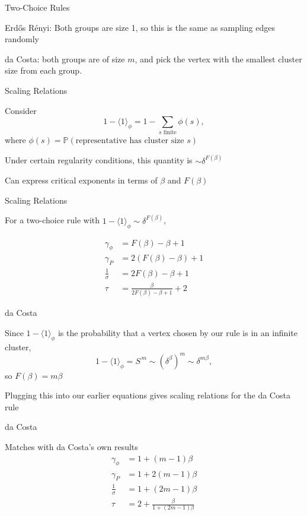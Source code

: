 \documentclass{beamer}
\newcommand{\ang}[1]{\langle #1 \rangle}
\newcommand{\ER}{Erd\H{o}s R\'enyi\xspace}
\newcommand{\nl}{
\vspace{5mm}

}
\begin{document}
\begin{frame}{Two-Choice Rules}
	
	\ER: Both groups are size 1, so this is the same as sampling edges randomly \nl

	\pause
	da Costa: both groups are of size $m$, and pick the vertex with the smallest cluster size from each group.
\end{frame}

\begin{frame}{Scaling Relations}
	
	Consider
	\[
	1 - \ang{1}_{\phi} = 1 - \sum_{s \text{ finite}} \phi(s),
	\] where $\phi(s) = \mathbb{P}( \text{representative has cluster size } s )$ \nl

	Under certain regularity conditions, this quantity is $\sim \delta^{F(\beta)}$ \nl

	\pause
	Can express critical exponents in terms of $\beta$ and $F(\beta)$
\end{frame}

\begin{frame}{Scaling Relations}

	For a two-choice rule with $1 - \ang{1}_{\phi} \sim \delta^{F(\beta)}$,

	\begin{align*}
		\gamma_{\phi} &= F(\beta) - \beta + 1 \\
		\gamma_{P} &= 2 (F(\beta) - \beta) + 1 \\
		\frac{1}{\sigma} &= 2 F(\beta) - \beta + 1 \\
		\tau &= \frac{\beta}{2 F(\beta) - \beta + 1} +2
	\end{align*}
	
\end{frame}

\begin{frame}{da Costa}

	Since $1 - \ang{1}_{\phi}$ is the probability that a vertex chosen by our rule is in an infinite cluster,
	\[
	1 - \ang{1}_{\phi} = S^{\,m} \sim (\delta^{\beta})^{m} \sim \delta^{m \beta},
	\] 
	so $F(\beta) = m\beta$ \nl

	Plugging this into our earlier equations gives scaling relations for the da Costa rule
\end{frame}

\begin{frame}{da Costa}
	
	Matches with da Costa's own results
	\begin{align*}
		\gamma_{\phi} &= 1 + (m-1)\beta \\
		\gamma_{P} &= 1 + 2(m-1)\beta \\
		\frac{1}{\sigma} &= 1 + (2m-1)\beta \\
		\tau &= 2 + \frac{\beta}{1 + (2m-1)\beta} 
	\end{align*}
\end{frame}
\end{document}
